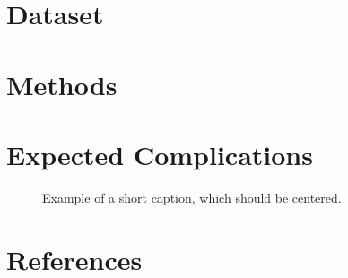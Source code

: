 \documentclass[10pt,twocolumn,letterpaper]{article}
\begin{document}
\section{Dataset}
\label{sec:Dataset}

\section{Methods}
\label{sec:Methods}

\section{Expected Complications}
\label{sec:Expected Complications}


\begin{figure*}
\begin{center}
\fbox{\rule{0pt}{2in} \rule{.9\linewidth}{0pt}}
\end{center}
   \caption{Example of a short caption, which should be centered.}
\label{fig:short}
\end{figure*}

%


\section{References}
\label{sec:References}


{\small


}
\end{document}
